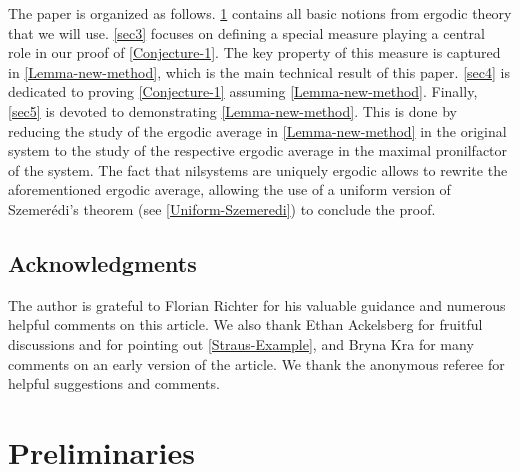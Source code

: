\documentclass[letter,11pt]{article}
\theoremstyle{definition}
\begin{document}
 
The paper is organized as follows. \cref{sec2} contains all basic notions from ergodic theory that we will use. \cref{sec3} focuses on defining a special measure playing a central role in our proof of \cref{Conjecture-1}. The key property of this measure is captured in \cref{Lemma-new-method}, which is the main technical result of this paper. \cref{sec4} is dedicated to proving \cref{Conjecture-1} assuming \cref{Lemma-new-method}. Finally, \cref{sec5} is devoted to demonstrating \cref{Lemma-new-method}. This is done by reducing the study of the ergodic average in \cref{Lemma-new-method} in the original system to the study of the respective ergodic average in the maximal pronilfactor of the system. The fact that nilsystems are uniquely ergodic allows to rewrite the aforementioned ergodic average, allowing the use of a uniform version of Szemerédi's theorem (see \cref{Uniform-Szemeredi}) to conclude the proof.



\subsection*{Acknowledgments}
The author is grateful to Florian Richter for his valuable guidance and numerous helpful comments on this article. We also thank Ethan Ackelsberg for fruitful discussions and for pointing out \cref{Straus-Example}, and Bryna Kra for many comments on an early version of the article. We thank the anonymous referee for helpful suggestions and comments.



\section{Preliminaries}\label{sec2}
\end{document}
